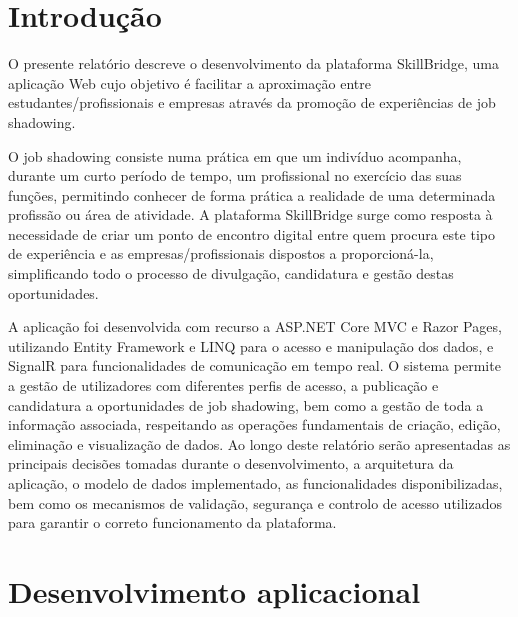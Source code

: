 \documentclass[12pt]{article}
\begin{document}



\raggedright
\setlength\parindent{24pt}
\renewcommand{\baselinestretch}{1.2}

\newpage
\tableofcontents

\newpage
\renewcommand{\listfigurename}{Lista de figuras}
\listoffigures

\newpage
\section{Introdução}
O presente relatório descreve o desenvolvimento da plataforma SkillBridge, uma aplicação Web cujo objetivo é facilitar a aproximação entre estudantes/profissionais e empresas através da promoção de experiências de job shadowing.
\par O job shadowing consiste numa prática em que um indivíduo acompanha, durante um curto período de tempo, um profissional no exercício das suas funções, permitindo conhecer de forma prática a realidade de uma determinada profissão ou área de atividade. A plataforma SkillBridge surge como resposta à necessidade de criar um ponto de encontro digital entre quem procura este tipo de experiência e as empresas/profissionais dispostos a proporcioná-la, simplificando todo o processo de divulgação, candidatura e gestão destas oportunidades.
\par A aplicação foi desenvolvida com recurso a ASP.NET Core MVC e Razor Pages, utilizando Entity Framework e LINQ para o acesso e manipulação dos dados, e SignalR para funcionalidades de comunicação em tempo real. O sistema permite a gestão de utilizadores com diferentes perfis de acesso, a publicação e candidatura a oportunidades de job shadowing, bem como a gestão de toda a informação associada, respeitando as operações fundamentais de criação, edição, eliminação e visualização de dados.
Ao longo deste relatório serão apresentadas as principais decisões tomadas durante o desenvolvimento, a arquitetura da aplicação, o modelo de dados implementado, as funcionalidades disponibilizadas, bem como os mecanismos de validação, segurança e controlo de acesso utilizados para garantir o correto funcionamento da plataforma.

\section{Desenvolvimento aplicacional}
\end{document}
